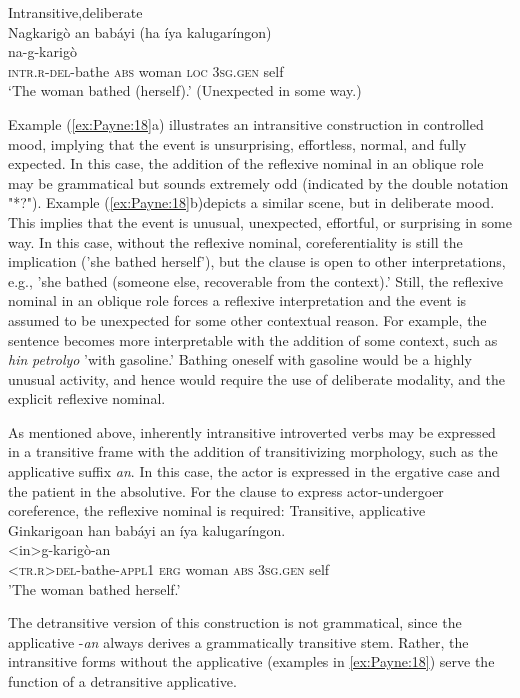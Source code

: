 \documentclass[output=paper]{langscibook}
\begin{document}
\ex
Intransitive,deliberate\\
\glll Nagkarigò an babáyi (ha íya kalugaríngon) \\
na-g-karigò { } { } { } { } { }\\
\textsc{intr.r-del}-bathe \textsc{abs} woman \textsc{loc} 3\textsc{sg.gen} self\\
\glt ‘The woman bathed (herself).' (Unexpected in some way.)

\z
\z


Example (\ref{ex:Payne:18}a) illustrates an intransitive construction in controlled mood, implying that the event is unsurprising, effortless, normal, and fully expected. In this case, the addition of the reflexive nominal in an oblique role may be grammatical but sounds extremely odd (indicated by the double notation "*?"). Example (\ref{ex:Payne:18}b)depicts a similar scene, but in deliberate mood. This implies that the event is unusual, unexpected, effortful, or surprising in some way. In this case, without the reflexive nominal, coreferentiality is still the implication ('she bathed herself'), but the clause is open to other interpretations, e.g., 'she bathed (someone else, recoverable from the context).' Still, the reflexive nominal in an oblique role forces a reflexive interpretation and the event is assumed to be unexpected for some other contextual reason. For example, the sentence becomes more interpretable with the addition of some context, such as \textit{hin} \textit{petrolyo} 'with gasoline.' Bathing oneself with gasoline would be a highly unusual activity, and hence would require the use of deliberate modality, and the explicit reflexive nominal.

As mentioned above, inherently intransitive introverted verbs may be expressed in a transitive frame with the addition of transitivizing morphology, such as the applicative suffix \textit{an}. In this case, the actor is expressed in the ergative case and the patient in the absolutive. For the clause to express actor-undergoer coreference, the reflexive nominal is required:
\ea \label{ex:Payne:19}
Transitive, applicative\\
\glll
 Ginkarigoan han babáyi an íya kalugaríngon. \\
 <in>g-karigò-an { } { } { } { } { }\\
 \textsc{<tr.r}>\textsc{del-}bathe-\textsc{appl}1 \textsc{erg} woman \textsc{abs} 3\textsc{sg.gen} self\\
\glt'The woman bathed herself.' 
\z


The detransitive version of this construction is not grammatical, since the applicative -\textit{an} always derives a grammatically transitive stem. Rather, the intransitive forms without the applicative (examples in \ref{ex:Payne:18}) serve the function of a detransitive applicative.
\end{document}
